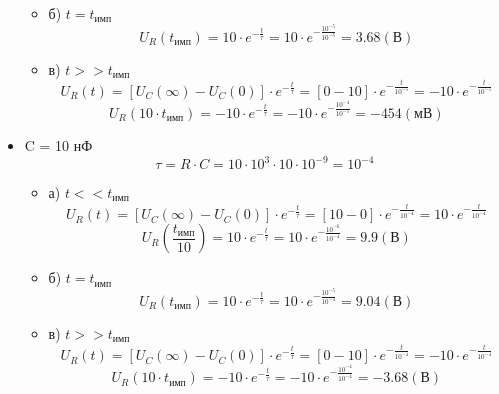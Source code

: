 \begin{itemize}
\begin{itemize}
\item[] б) $t = t_\text{имп}$\\
	\begin{equation}
		U_R(t_\text{имп}) = 10 \cdot e^{-\frac{t}{\tau}} = 10 \cdot e^{-\frac{10^{-5}}{10^{-5}}} = 3.68 (\text{В})
	\end{equation}
	
\item[] в) $t >> t_\text{имп}$\\
	\begin{equation}
		U_R(t) = [U_C(\infty) - U_C(0)] \cdot e^{-\frac{t}{\tau}} = [0 - 10] \cdot e^{-\frac{t}{10^{-5}}} = -10 \cdot e^{-\frac{t}{10^{-5}}}
	\end{equation}
	\begin{equation}
		U_R(10 \cdot t_\text{имп}) = -10 \cdot e^{-\frac{t}{\tau}} = -10 \cdot e^{-\frac{10^{-4}}{10^{-5}}} = -454 (\text{мВ})
	\end{equation}
\end{itemize}

\item C = 10 нФ\\
\begin{equation}
		\tau = R \cdot C = 10 \cdot 10^3 \cdot 10 \cdot 10^{-9} = 10^{-4}
\end{equation}
\begin{itemize}
\item[] а) $t << t_\text{имп}$\\
	\begin{equation}
		U_R(t) = [U_C(\infty) - U_C(0)] \cdot e^{-\frac{t}{\tau}} = [10 - 0] \cdot e^{-\frac{t}{10^{-4}}} = 10 \cdot e^{-\frac{t}{10^{-4}}}
	\end{equation}
	\begin{equation}
		U_R(\frac{t_\text{имп}}{10}) = 10 \cdot e^{-\frac{t}{\tau}} = 10 \cdot e^{-\frac{10^{-6}}{10^{-4}}} = 9.9 (\text{В})
	\end{equation}

\item[] б) $t = t_\text{имп}$\\
	\begin{equation}
		U_R(t_\text{имп}) = 10 \cdot e^{-\frac{t}{\tau}} = 10 \cdot e^{-\frac{10^{-5}}{10^{-4}}} = 9.04 (\text{В})
	\end{equation}
	
\item[] в) $t >> t_\text{имп}$\\
	\begin{equation}
		U_R(t) = [U_C(\infty) - U_C(0)] \cdot e^{-\frac{t}{\tau}} = [0 - 10] \cdot e^{-\frac{t}{10^{-4}}} = -10 \cdot e^{-\frac{t}{10^{-4}}}
	\end{equation}
	\begin{equation}
		U_R(10 \cdot t_\text{имп}) = -10 \cdot e^{-\frac{t}{\tau}} = -10 \cdot e^{-\frac{10^{-4}}{10^{-4}}} = -3.68 (\text{В})
	\end{equation}
\end{itemize}
\end{itemize}

